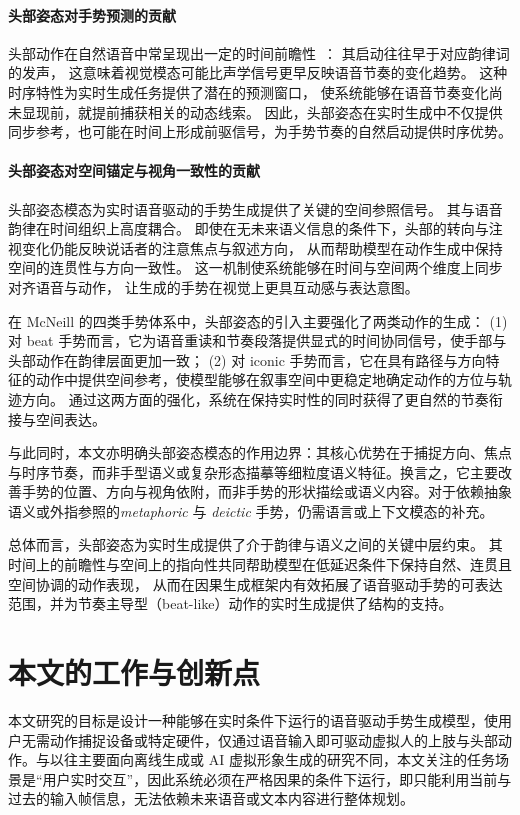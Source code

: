 \paragraph{头部姿态对手势预测的贡献}
头部动作在自然语音中常呈现出一定的时间前瞻性~\cite{esteve2017timing}：%
其启动往往早于对应韵律词的发声，%
这意味着视觉模态可能比声学信号更早反映语音节奏的变化趋势。%
这种时序特性为实时生成任务提供了潜在的预测窗口，%
使系统能够在语音节奏变化尚未显现前，就提前捕获相关的动态线索。%
因此，头部姿态在实时生成中不仅提供同步参考，也可能在时间上形成前驱信号，为手势节奏的自然启动提供时序优势。%

\paragraph{头部姿态对空间锚定与视角一致性的贡献}
头部姿态模态为实时语音驱动的手势生成提供了关键的空间参照信号。%
其与语音韵律在时间组织上高度耦合。%
即使在无未来语义信息的条件下，头部的转向与注视变化仍能反映说话者的注意焦点与叙述方向，%
从而帮助模型在动作生成中保持空间的连贯性与方向一致性。%
这一机制使系统能够在时间与空间两个维度上同步对齐语音与动作，%
让生成的手势在视觉上更具互动感与表达意图。

在 McNeill 的四类手势体系中，头部姿态的引入主要强化了两类动作的生成：  
(1) 对 beat 手势而言，它为语音重读和节奏段落提供显式的时间协同信号，使手部与头部动作在韵律层面更加一致；  
(2) 对 iconic 手势而言，它在具有路径与方向特征的动作中提供空间参考，使模型能够在叙事空间中更稳定地确定动作的方位与轨迹方向。  
通过这两方面的强化，系统在保持实时性的同时获得了更自然的节奏衔接与空间表达。

与此同时，本文亦明确头部姿态模态的作用边界：其核心优势在于捕捉方向、焦点与时序节奏，而非手型语义或复杂形态描摹等细粒度语义特征。换言之，它主要改善手势的位置、方向与视角依附，而非手势的形状描绘或语义内容。对于依赖抽象语义或外指参照的\emph{metaphoric} 与 \emph{deictic} 手势，仍需语言或上下文模态的补充。

总体而言，头部姿态为实时生成提供了介于韵律与语义之间的关键中层约束。%
其时间上的前瞻性与空间上的指向性共同帮助模型在低延迟条件下保持自然、连贯且空间协调的动作表现，%
从而在因果生成框架内有效拓展了语音驱动手势的可表达范围，并为节奏主导型（beat-like）动作的实时生成提供了结构的支持。

\section{本文的工作与创新点}

本文研究的目标是设计一种能够在实时条件下运行的语音驱动手势生成模型，使用户无需动作捕捉设备或特定硬件，仅通过语音输入即可驱动虚拟人的上肢与头部动作。与以往主要面向离线生成或 AI 虚拟形象生成的研究不同，本文关注的任务场景是“用户实时交互”，因此系统必须在严格因果的条件下运行，即只能利用当前与过去的输入帧信息，无法依赖未来语音或文本内容进行整体规划。

